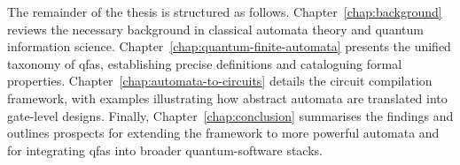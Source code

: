 The remainder of the thesis is structured as follows. Chapter~\ref{chap:background} reviews the necessary background in classical automata theory and quantum information science. Chapter~\ref{chap:quantum-finite-automata} presents the unified taxonomy of \glspl{qfa}, establishing precise definitions and cataloguing formal properties. Chapter~\ref{chap:automata-to-circuits} details the circuit compilation framework, with examples illustrating how abstract automata are translated into gate-level designs. Finally, Chapter~\ref{chap:conclusion} summarises the findings and outlines prospects for extending the framework to more powerful automata and for integrating \glspl{qfa} into broader quantum-software stacks.


